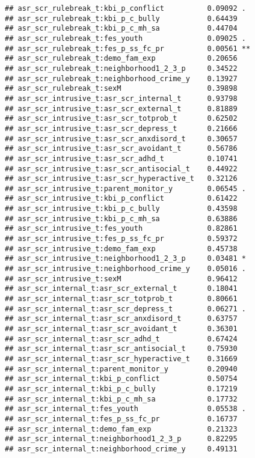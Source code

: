 \documentclass[
]{article}
\begin{document}
\begin{verbatim}
## asr_scr_rulebreak_t:kbi_p_conflict          0.09092 .  
## asr_scr_rulebreak_t:kbi_p_c_bully           0.64439    
## asr_scr_rulebreak_t:kbi_p_c_mh_sa           0.44704    
## asr_scr_rulebreak_t:fes_youth               0.09025 .  
## asr_scr_rulebreak_t:fes_p_ss_fc_pr          0.00561 ** 
## asr_scr_rulebreak_t:demo_fam_exp            0.20656    
## asr_scr_rulebreak_t:neighborhood1_2_3_p     0.34522    
## asr_scr_rulebreak_t:neighborhood_crime_y    0.13927    
## asr_scr_rulebreak_t:sexM                    0.39898    
## asr_scr_intrusive_t:asr_scr_internal_t      0.93798    
## asr_scr_intrusive_t:asr_scr_external_t      0.81889    
## asr_scr_intrusive_t:asr_scr_totprob_t       0.62502    
## asr_scr_intrusive_t:asr_scr_depress_t       0.21666    
## asr_scr_intrusive_t:asr_scr_anxdisord_t     0.30657    
## asr_scr_intrusive_t:asr_scr_avoidant_t      0.56786    
## asr_scr_intrusive_t:asr_scr_adhd_t          0.10741    
## asr_scr_intrusive_t:asr_scr_antisocial_t    0.44922    
## asr_scr_intrusive_t:asr_scr_hyperactive_t   0.32126    
## asr_scr_intrusive_t:parent_monitor_y        0.06545 .  
## asr_scr_intrusive_t:kbi_p_conflict          0.61422    
## asr_scr_intrusive_t:kbi_p_c_bully           0.43598    
## asr_scr_intrusive_t:kbi_p_c_mh_sa           0.63886    
## asr_scr_intrusive_t:fes_youth               0.82861    
## asr_scr_intrusive_t:fes_p_ss_fc_pr          0.59372    
## asr_scr_intrusive_t:demo_fam_exp            0.45738    
## asr_scr_intrusive_t:neighborhood1_2_3_p     0.03481 *  
## asr_scr_intrusive_t:neighborhood_crime_y    0.05016 .  
## asr_scr_intrusive_t:sexM                    0.96412    
## asr_scr_internal_t:asr_scr_external_t       0.18041    
## asr_scr_internal_t:asr_scr_totprob_t        0.80661    
## asr_scr_internal_t:asr_scr_depress_t        0.06271 .  
## asr_scr_internal_t:asr_scr_anxdisord_t      0.63757    
## asr_scr_internal_t:asr_scr_avoidant_t       0.36301    
## asr_scr_internal_t:asr_scr_adhd_t           0.67424    
## asr_scr_internal_t:asr_scr_antisocial_t     0.75930    
## asr_scr_internal_t:asr_scr_hyperactive_t    0.31669    
## asr_scr_internal_t:parent_monitor_y         0.20940    
## asr_scr_internal_t:kbi_p_conflict           0.50754    
## asr_scr_internal_t:kbi_p_c_bully            0.17219    
## asr_scr_internal_t:kbi_p_c_mh_sa            0.17732    
## asr_scr_internal_t:fes_youth                0.05538 .  
## asr_scr_internal_t:fes_p_ss_fc_pr           0.16737    
## asr_scr_internal_t:demo_fam_exp             0.21323    
## asr_scr_internal_t:neighborhood1_2_3_p      0.82295    
## asr_scr_internal_t:neighborhood_crime_y     0.49131    

\end{verbatim}
\end{document}
